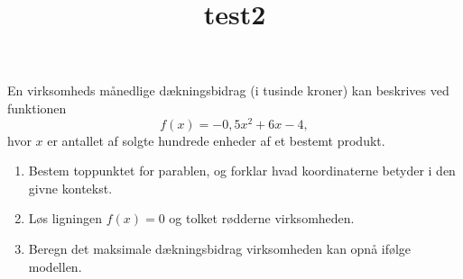 \documentclass[10pt,a4paper,table]{article}
\title{\vestb test2}
\author{}
\date{}
\begin{document}
\thispagestyle{plain}

\section{}
\subsection{}

En virksomheds månedlige dækningsbidrag (i tusinde kroner) kan beskrives ved funktionen
\[
f(x) = -0{,}5x^2 + 6x - 4,
\]
hvor \(x\) er antallet af solgte hundrede enheder af et bestemt produkt.

\begin{enumerate}
  \item Bestem toppunktet for parablen, og forklar hvad koordinaterne betyder i den givne kontekst.
  \item Løs ligningen \(f(x) = 0\) og tolket rødderne virksomheden.
  \item Beregn det maksimale dækningsbidrag virksomheden kan opnå ifølge modellen.
\end{enumerate}
\end{document}
